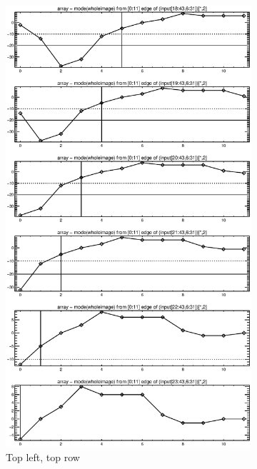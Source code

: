 \documentclass[10pt]{article}
\begin{document}
\begin{figure}[!h]
    \centering 
    \hspace{-1.0in}
    \begin{subfigure}[b]{.4\linewidth}
        \centering
        \includegraphics[width=1.4\textwidth]{../plots_tables_images/topleft2.eps} 
        \caption{Top left, top row}
    \end{subfigure}
    \hspace{1.0in}
    \begin{subfigure}[b]{.4\linewidth}

\end{subfigure}
\end{figure}
\end{document}
